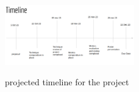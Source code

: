 \documentclass[10pt, conference]{IEEEtran}
\begin{document}
\begin{figure}[h]
  \caption{projected timeline for the project}
  \includegraphics[width=0.5\textwidth]{timeline}
  \label{fig:timline}
\end{figure}

\balance


\end{document}
